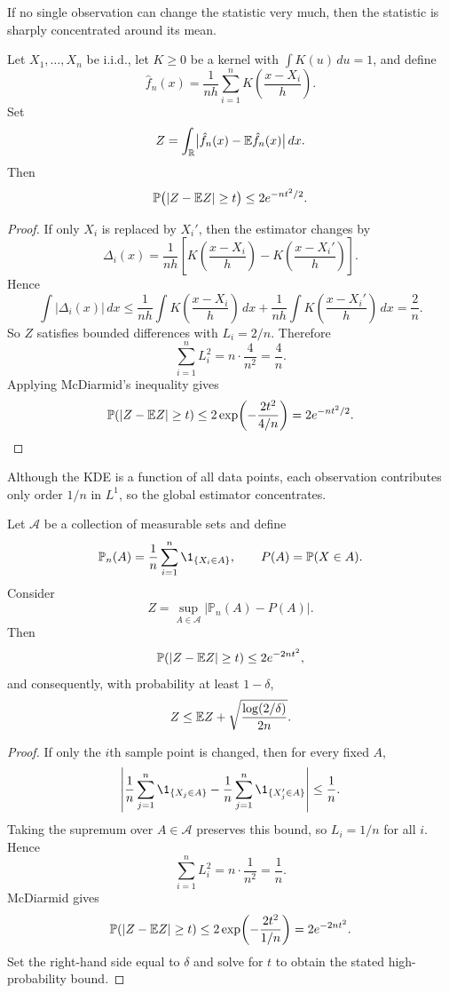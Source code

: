 \begin{remark}
If no single observation can change the statistic very much, then the statistic is sharply concentrated around its mean.
\end{remark}


\begin{eg}
Let $X_1,\dots,X_n$ be i.i.d., let $K\ge 0$ be a kernel with $\int K(u)\,du=1$, and define
\[
\hat f_n(x)=\frac{1}{nh}\sum_{i=1}^n K\!\left(\frac{x-X_i}{h}\right).
\]
Set
\[
Z=\int_{\mathbb{R}} \bigl|\hat f_n(x)-\mathbb{E} \hat f_n(x)\bigr|\,dx.
\]
Then
\[
\mathbb{P}\bigl(|Z-\mathbb{E} Z|\ge t\bigr)\le 2e^{-nt^2/2}.
\]
\end{eg}

\begin{proof}
If only $X_i$ is replaced by $X_i'$, then the estimator changes by
\[
\Delta_i(x)
=
\frac{1}{nh}
\left[
K\!\left(\frac{x-X_i}{h}\right)-K\!\left(\frac{x-X_i'}{h}\right)
\right].
\]
Hence
\[
\int |\Delta_i(x)|\,dx
\le
\frac{1}{nh}\int K\!\left(\frac{x-X_i}{h}\right)\,dx
+
\frac{1}{nh}\int K\!\left(\frac{x-X_i'}{h}\right)\,dx
=
\frac{2}{n}.
\]
So $Z$ satisfies bounded differences with $L_i=2/n$. Therefore
\[
\sum_{i=1}^n L_i^2 = n\cdot \frac{4}{n^2}=\frac{4}{n}.
\]
Applying McDiarmid's inequality gives
\[
\mathbb{P}(|Z-\mathbb{E} Z|\ge t)
\le
2\exp\!\left(-\frac{2t^2}{4/n}\right)
=
2e^{-nt^2/2}.
\]
\end{proof}

\begin{remark}
Although the KDE is a function of all data points, each observation contributes only order $1/n$ in $L^1$, so the global estimator concentrates.
\end{remark}

\begin{eg}
Let $\mathcal{A}$ be a collection of measurable sets and define
\[
\mathbb{P}_n(A)=\frac1n\sum_{i=1}^n \1_{\{X_i\in A\}},
\qquad
P(A)=\pr(X\in A).
\]
Consider
\[
Z=\sup_{A\in\mathcal{A}} |\mathbb{P}_n(A)-P(A)|.
\]
Then
\[
\mathbb{P}(|Z-\mathbb{E} Z|\ge t)\le 2e^{-2nt^2},
\]
and consequently, with probability at least $1-\delta$,
\[
Z\le \mathbb{E} Z+\sqrt{\frac{\log(2/\delta)}{2n}}.
\]
\end{eg}

\begin{proof}
If only the $i$th sample point is changed, then for every fixed $A$,
\[
\left|
\frac{1}{n}\sum_{j=1}^n \1_{\{X_j\in A\}}
-
\frac{1}{n}\sum_{j=1}^n \1_{\{X_j'\in A\}}
\right|
\le \frac{1}{n}.
\]
Taking the supremum over $A\in\mathcal{A}$ preserves this bound, so $L_i=1/n$ for all $i$. Hence
\[
\sum_{i=1}^n L_i^2 = n\cdot \frac{1}{n^2}=\frac1n.
\]
McDiarmid gives
\[
\mathbb{P}(|Z-\mathbb{E} Z|\ge t)
\le
2\exp\!\left(-\frac{2t^2}{1/n}\right)
=
2e^{-2nt^2}.
\]
Set the right-hand side equal to $\delta$ and solve for $t$ to obtain the stated high-probability bound.
\end{proof}

